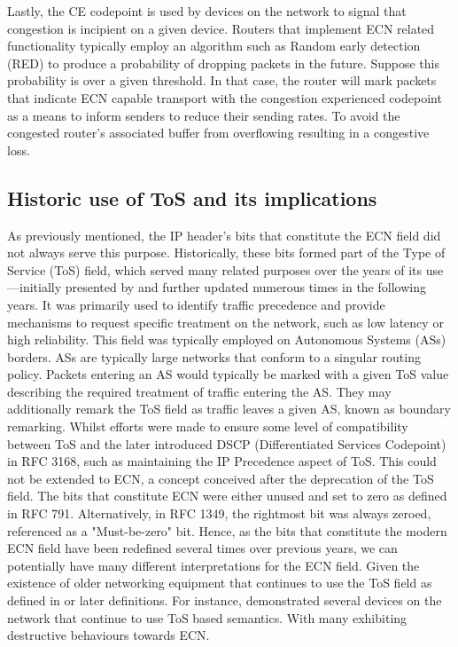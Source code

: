 \documentclass{l4proj}
\begin{document}
Lastly, the CE codepoint is used by devices on the network to signal that congestion is incipient on a given device. Routers that implement ECN related functionality typically employ an algorithm such as Random early detection (RED) to produce a probability of dropping packets in the future. Suppose this probability is over a given threshold. In that case, the router will mark packets that indicate ECN capable transport with the congestion experienced codepoint as a means to inform senders to reduce their sending rates. To avoid the congested router's associated buffer from overflowing resulting in a congestive loss.

\subsection{Historic use of ToS and its implications}

As previously mentioned, the IP header's bits that constitute the ECN field did not always serve this purpose. Historically, these bits formed part of the Type of Service (ToS) field, which served many related purposes over the years of its use—initially presented by \citep{rfc791} and further updated numerous times in the following years. It was primarily used to identify traffic precedence and provide mechanisms to request specific treatment on the network, such as low latency or high reliability. This field was typically employed on Autonomous Systems (ASs) borders. ASs are typically large networks that conform to a singular routing policy. Packets entering an AS would typically be marked with a given ToS value describing the required treatment of traffic entering the AS. They may additionally remark the ToS field as traffic leaves a given AS, known as boundary remarking. Whilst efforts were made to ensure some level of compatibility between ToS and the later introduced DSCP (Differentiated Services Codepoint) in RFC 3168, such as maintaining the IP Precedence aspect of ToS\citep{rfc3168}. This could not be extended to ECN, a concept conceived after the deprecation of the ToS field. The bits that constitute ECN were either unused and set to zero as defined in RFC 791\citep{rfc791}. Alternatively, in RFC 1349, the rightmost bit was always zeroed, referenced as a "Must-be-zero" bit\citep{rfc1349}. Hence, as the bits that constitute the modern ECN field have been redefined several times over previous years, we can potentially have many different interpretations for the ECN field. Given the existence of older networking equipment that continues to use the ToS field as defined in \cite{rfc791} or later definitions. For instance, \cite{custura_exploring_2017} demonstrated several devices on the network that continue to use ToS based semantics. With many exhibiting destructive behaviours towards ECN.
\end{document}
